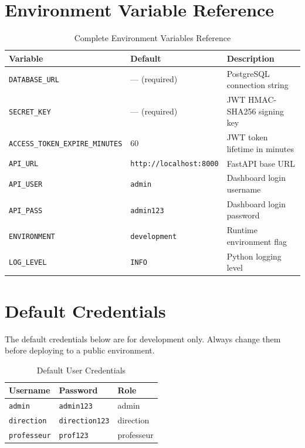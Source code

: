 \documentclass[12pt, a4paper]{report}
\begin{document}
\appendix

\chapter{Environment Variable Reference}

\begin{table}[H]
\centering
\caption{Complete Environment Variables Reference}
\label{tab:full_env}
\begin{tabular}{@{}lll@{}}
\toprule
\textbf{Variable} & \textbf{Default} & \textbf{Description} \\
\midrule
\texttt{DATABASE\_URL}               & — (required)    & PostgreSQL connection string \\
\texttt{SECRET\_KEY}                 & — (required)    & JWT HMAC-SHA256 signing key \\
\texttt{ACCESS\_TOKEN\_EXPIRE\_MINUTES} & 60           & JWT token lifetime in minutes \\
\texttt{API\_URL}                    & \texttt{http://localhost:8000} & FastAPI base URL \\
\texttt{API\_USER}                   & \texttt{admin} & Dashboard login username \\
\texttt{API\_PASS}                   & \texttt{admin123} & Dashboard login password \\
\texttt{ENVIRONMENT}                 & \texttt{development} & Runtime environment flag \\
\texttt{LOG\_LEVEL}                  & \texttt{INFO}  & Python logging level \\
\bottomrule
\end{tabular}
\end{table}

\chapter{Default Credentials}

\begin{warningbox}
The default credentials below are for development only. Always change them before deploying to a public environment.
\end{warningbox}

\begin{table}[H]
\centering
\caption{Default User Credentials}
\label{tab:credentials}
\begin{tabular}{@{}lll@{}}
\toprule
\textbf{Username} & \textbf{Password} & \textbf{Role} \\
\midrule
\texttt{admin}      & \texttt{admin123}     & admin \\
\texttt{direction}  & \texttt{direction123} & direction \\
\texttt{professeur} & \texttt{prof123}      & professeur \\
\bottomrule
\end{tabular}
\end{table}
\end{document}
